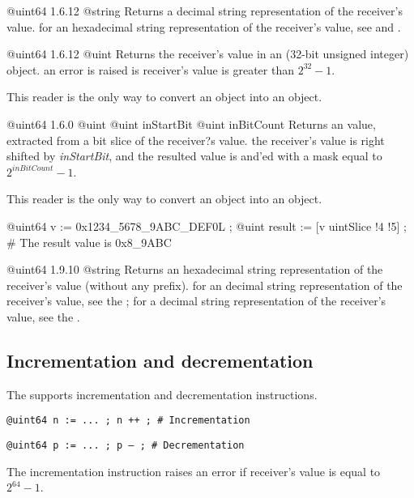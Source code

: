 {@uint64}
{1.6.12}
{@string}
{Returns a decimal string representation of the receiver's value.}
{for an hexadecimal string representation of the receiver's value, see  and .}



{@uint64}
{1.6.12}
{@uint}
{Returns the receiver's value in an  (32-bit unsigned integer) object.}
{an error is raised is receiver's value is greater than $2^{32}-1$.}

This reader is the only way to convert an  object into an  object.


{@uint64}
{1.6.0}
{@uint}
{@uint inStartBit}
{@uint inBitCount}
{Returns an  value, extracted from a bit slice of the receiver?s value.}
{the receiver's value is right shifted by \emph{inStartBit}, and the resulted value is and'ed with a mask equal to $2^{inBitCount}-1$.}

This reader is the only way to convert an  object into an  object.


\exempleDeuxLignes
{@uint64 v := 0x1234\_5678\_9ABC\_DEF0L ;}
{@uint result := [v uintSlice !4 !5] ; \# The result value is 0x8\_9ABC}




{@uint64}
{1.9.10}
{@string}
{Returns an hexadecimal string representation of the receiver's value (without any prefix).}
{for an decimal string representation of the receiver's value, see the ; for a decimal string representation of the receiver's value, see the .}






\subsection{Incrementation and decrementation}

The  supports incrementation and decrementation instructions.

\texttt{@uint64 n := ... ; n ++ ; \# Incrementation}

\texttt{@uint64 p := ... ; p -- ; \# Decrementation}\newline

The incrementation instruction raises an error if receiver's value is equal to $2^{64}-1$.\newline

